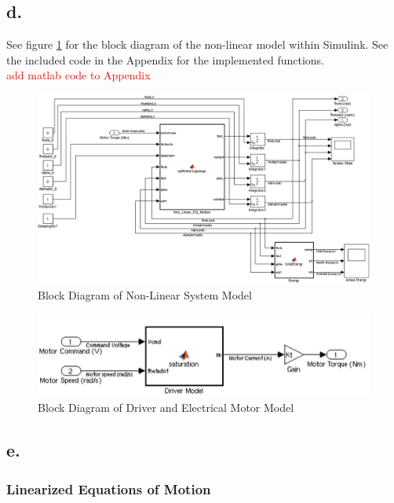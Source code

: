 \documentclass{article}
\newcommand{\xxx}[1]{\textcolor{red}{#1}}
\theoremstyle{plain}
\theoremstyle{definition}
\theoremstyle{remark}
\begin{document}
\subsection*{d.}
See figure \ref{NonLinearBlock} for the block diagram of the non-linear model within Simulink.  See the included code in the Appendix for the implemented functions. \\
\xxx{add matlab code to Appendix}

\begin{figure}
\begin{center}
\includegraphics[width = 15cm]{NonLinearModelPic.png}
\end{center}
\caption{Block Diagram of Non-Linear System Model}
\label{NonLinearBlock}
\end{figure}

\begin{figure}
\begin{center}
\includegraphics[width = 12cm]{DriverandMotorModel.png}
\end{center}
\caption{Block Diagram of Driver and Electrical Motor Model}
\label{DriverNonLinearBlock}
\end{figure}

\subsection*{e.}
\subsubsection*{Linearized Equations of Motion}
\end{document}
